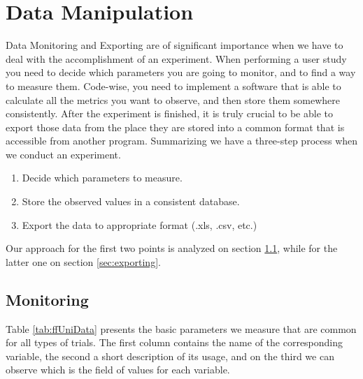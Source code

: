 \section{Data Manipulation}

Data Monitoring and Exporting are of significant importance when we have to deal with the accomplishment of an experiment. When performing a user study you need to decide which parameters you are going to monitor, and to find a way to measure them. Code-wise, you need to implement a software that is able to calculate all the metrics you want to observe, and then store them somewhere consistently. After the experiment is finished, it is truly crucial to be able to export those data from the place they are stored into a common format that is accessible from another program. Summarizing we have a three-step process when we conduct an experiment. 

\begin{enumerate}
	\item Decide which parameters to measure.
	\item Store the observed values in a consistent database.
	\item Export the data to appropriate format (.xls, .csv, etc.)
\end{enumerate}

Our approach for the first two points is analyzed on section \ref{sec:monitoring}, while for the latter one on section \ref{sec:exporting}.
\subsection{Monitoring}
\label{sec:monitoring}

Table \ref{tab:ffUniData} presents the basic parameters we measure that are common for all types of trials. The first column contains the name of the corresponding variable, the second a short description of its usage, and on the third we can observe which is the field of values for each variable.


